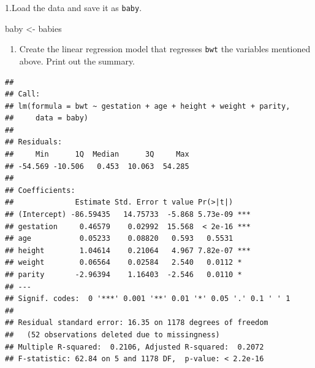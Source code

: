 \documentclass[]{article}
\newenvironment{Shaded}{\begin{snugshade}}{\end{snugshade}}
\newcommand{\DataTypeTok}[1]{\textcolor[rgb]{0.13,0.29,0.53}{#1}}
\newcommand{\KeywordTok}[1]{\textcolor[rgb]{0.13,0.29,0.53}{\textbf{#1}}}
\newcommand{\NormalTok}[1]{#1}
\newcommand{\OperatorTok}[1]{\textcolor[rgb]{0.81,0.36,0.00}{\textbf{#1}}}
\newcommand{\StringTok}[1]{\textcolor[rgb]{0.31,0.60,0.02}{#1}}
\providecommand{\tightlist}{%
  \setlength{\itemsep}{0pt}\setlength{\parskip}{0pt}}
\begin{document}
1.Load the data and save it as \texttt{baby}.

\begin{Shaded}
\begin{Highlighting}[]
\NormalTok{baby <-}\StringTok{ }\NormalTok{babies}
\end{Highlighting}
\end{Shaded}

\begin{enumerate}
\def\labelenumi{\arabic{enumi}.}
\setcounter{enumi}{1}
\tightlist
\item
  Create the linear regression model that regresses \texttt{bwt} the
  variables mentioned above. Print out the summary.
\end{enumerate}

\begin{Shaded}
\end{Shaded}

\begin{verbatim}
## 
## Call:
## lm(formula = bwt ~ gestation + age + height + weight + parity, 
##     data = baby)
## 
## Residuals:
##     Min      1Q  Median      3Q     Max 
## -54.569 -10.506   0.453  10.063  54.285 
## 
## Coefficients:
##              Estimate Std. Error t value Pr(>|t|)    
## (Intercept) -86.59435   14.75733  -5.868 5.73e-09 ***
## gestation     0.46579    0.02992  15.568  < 2e-16 ***
## age           0.05233    0.08820   0.593   0.5531    
## height        1.04614    0.21064   4.967 7.82e-07 ***
## weight        0.06564    0.02584   2.540   0.0112 *  
## parity       -2.96394    1.16403  -2.546   0.0110 *  
## ---
## Signif. codes:  0 '***' 0.001 '**' 0.01 '*' 0.05 '.' 0.1 ' ' 1
## 
## Residual standard error: 16.35 on 1178 degrees of freedom
##   (52 observations deleted due to missingness)
## Multiple R-squared:  0.2106, Adjusted R-squared:  0.2072 
## F-statistic: 62.84 on 5 and 1178 DF,  p-value: < 2.2e-16
\end{verbatim}
\end{document}
